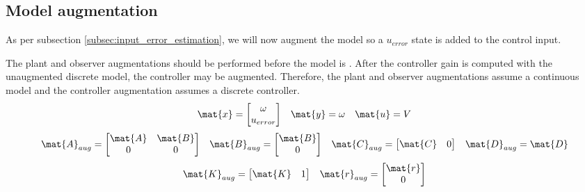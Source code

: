 \subsection{Model augmentation}

As per subsection \ref{subsec:input_error_estimation}, we will now augment the
\gls{model} so a $u_{error}$ state is added to the \gls{control input}.

The \gls{plant} and \gls{observer} augmentations should be performed before the
\gls{model} is . After the \gls{controller}
gain is computed with the unaugmented discrete \gls{model}, the controller may
be augmented. Therefore, the \gls{plant} and \gls{observer} augmentations assume
a continuous \gls{model} and the \gls{controller} augmentation assumes a
discrete \gls{controller}.
\begin{equation*}
  \begin{array}{ccc}
    \mat{x} =
    \begin{bmatrix}
      \omega \\
      u_{error}
    \end{bmatrix} &
    \mat{y} = \omega &
    \mat{u} = V
  \end{array}
\end{equation*}
\begin{equation}
  \begin{array}{cccc}
    \mat{A}_{aug} =
    \begin{bmatrix}
      \mat{A} & \mat{B} \\
      0 & 0
    \end{bmatrix} &
    \mat{B}_{aug} =
    \begin{bmatrix}
      \mat{B} \\
      0
    \end{bmatrix} &
    \mat{C}_{aug} = \begin{bmatrix}
      \mat{C} & 0
    \end{bmatrix} &
    \mat{D}_{aug} = \mat{D}
  \end{array}
\end{equation}
\begin{equation}
  \begin{array}{cc}
    \mat{K}_{aug} = \begin{bmatrix}
      \mat{K} & 1
    \end{bmatrix} &
    \mat{r}_{aug} = \begin{bmatrix}
      \mat{r} \\
      0
    \end{bmatrix}
  \end{array}
\end{equation}

